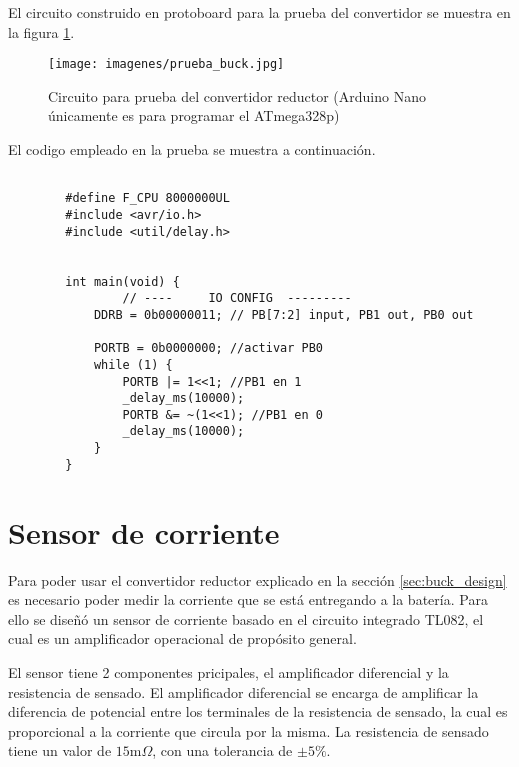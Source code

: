 El circuito construido en protoboard para la prueba del convertidor se muestra
en la figura \ref{fig:prueba_buck}.

\begin{figure}[H]	
    \centering
    \texttt{[image: imagenes/prueba\_buck.jpg]}
    \caption{Circuito para prueba del convertidor reductor (Arduino Nano únicamente
    es para programar el ATmega328p)} 
    \label{fig:prueba_buck}
\end{figure}

El codigo empleado en la prueba se muestra a continuación.

    \begin{lstlisting}

        #define F_CPU 8000000UL
        #include <avr/io.h>
        #include <util/delay.h>


        int main(void) {
                // ----     IO CONFIG  ---------
            DDRB = 0b00000011; // PB[7:2] input, PB1 out, PB0 out
            
            PORTB = 0b0000000; //activar PB0
            while (1) {
                PORTB |= 1<<1; //PB1 en 1
                _delay_ms(10000);
                PORTB &= ~(1<<1); //PB1 en 0
                _delay_ms(10000);
            }
        }

    \end{lstlisting}






\section{Sensor de corriente}

    Para poder usar el convertidor reductor explicado en la sección
    \ref{sec:buck_design} es necesario poder medir la corriente que se
    está entregando a la batería. Para ello se diseñó un sensor de corriente
    basado en el circuito integrado TL082, el cual es un amplificador operacional
    de propósito general.

    El sensor tiene 2 componentes pricipales, el amplificador diferencial y 
    la resistencia de sensado. El amplificador diferencial se encarga de 
    amplificar la diferencia de potencial entre los terminales de la resistencia
    de sensado, la cual es proporcional a la corriente que circula por la misma.
    La resistencia de sensado tiene un valor de $15 \text{m}\Omega$, con una tolerancia
    de $\pm 5\%$.

